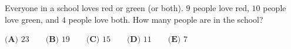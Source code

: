 Everyone in a school loves red or green (or both). $9$ people love red, $10$ people love green, and $4$ people love both. How many people are in the school?

$\textbf{(A) }23\qquad\textbf{(B) }19\qquad\textbf{(C) }15\qquad\textbf{(D) }11\qquad\textbf{(E) }7$
